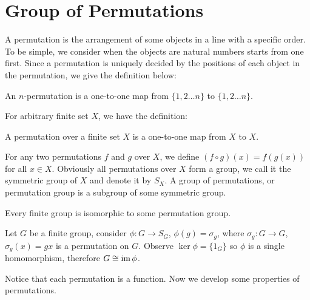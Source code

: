 \section{Group of Permutations}
A permutation is the arrangement of some objects in a line with a specific order. To be simple, we consider when the objects are natural numbers starts from one first. Since a permutation is uniquely decided by the positions of each object in the permutation, we give the definition below:
\begin{defi}
An $n$-permutation is a one-to-one map from $\{1, 2 \dots n\}$ to $\{1, 2 \dots n\}$.
\end{defi}
For arbitrary finite set $X$, we have the definition:
\begin{defi}
A permutation over a finite set $X$ is a one-to-one map from $X$ to $X$.
\end{defi}
For any two permutations $f$ and $g$ over $X$, we define $(f \circ g)(x)=f(g(x))$ for all $x \in X$.
Obviously all permutations over $X$ form a group, we call it the symmetric group of $X$ and denote it by $S_X$.
A group of permutations, or permutation group is a subgroup of some symmetric group.
\begin{thm}[Cayley]
Every finite group is isomorphic to some permutation group.
\end{thm}
\begin{prf}
Let $G$ be a finite group, consider $\phi : G \to S_G$, $\phi(g) = \sigma_g$, where $\sigma_g : G \to G$, $\sigma_g(x) = gx$ is a permutation on $G$.
Observe $\ker \phi = \{1_G\}$ so $\phi$ is a single homomorphism, therefore $G \cong \mathop{\mathrm{im}} \phi$.
\end{prf}
Notice that each permutation is a function.
Now we develop some properties of permutations.


